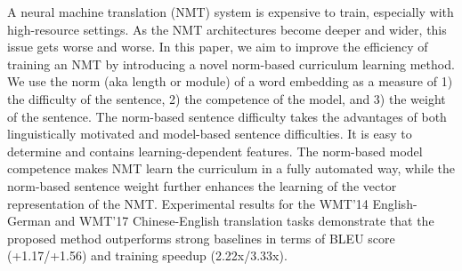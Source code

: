 A neural machine translation (NMT) system is expensive to train, especially with high-resource settings. As the NMT architectures become deeper and wider, this issue gets worse and worse. In this paper, we aim to improve the efficiency of training an NMT by introducing a novel norm-based curriculum learning method. We use the norm (aka length or module) of a word embedding as a measure of 1) the difficulty of the sentence, 2) the competence of the model, and 3) the weight of the sentence. The norm-based sentence difficulty takes the advantages of both linguistically motivated and model-based sentence difficulties. It is easy to determine and contains learning-dependent features. The norm-based model competence makes NMT learn the curriculum in a fully automated way, while the norm-based sentence weight further enhances the learning of the vector representation of the NMT. Experimental results for the WMT'14 English-German and WMT'17 Chinese-English translation tasks demonstrate that the proposed method outperforms strong baselines in terms of BLEU score (+1.17/+1.56) and training speedup (2.22x/3.33x).
